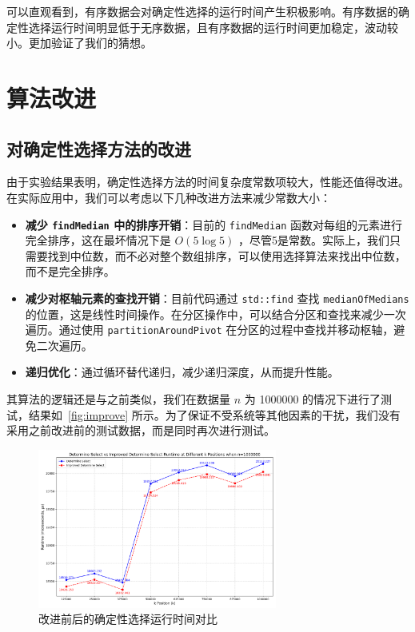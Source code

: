 可以直观看到，有序数据会对确定性选择的运行时间产生积极影响。有序数据的确定性选择运行时间明显低于无序数据，且有序数据的运行时间更加稳定，波动较小。更加验证了我们的猜想。
\section{算法改进}

\subsection{对确定性选择方法的改进}

由于实验结果表明，确定性选择方法的时间复杂度常数项较大，性能还值得改进。在实际应用中，我们可以考虑以下几种改进方法来减少常数大小：\begin{itemize}
    \item \textbf{减少 \texttt{findMedian} 中的排序开销}：目前的 \texttt{findMedian} 函数对每组的元素进行完全排序，这在最坏情况下是 $O(5 \log 5)$ ，尽管5是常数。实际上，我们只需要找到中位数，而不必对整个数组排序，可以使用选择算法来找出中位数，而不是完全排序。
    \item \textbf{减少对枢轴元素的查找开销}：目前代码通过 \texttt{std::find} 查找 \texttt{medianOfMedians} 的位置，这是线性时间操作。在分区操作中，可以结合分区和查找来减少一次遍历。通过使用 \texttt{partitionAroundPivot} 在分区的过程中查找并移动枢轴，避免二次遍历。
    \item \textbf{递归优化}：通过循环替代递归，减少递归深度，从而提升性能。
\end{itemize}

其算法的逻辑还是与之前类似，我们在数据量 $n$ 为 1000000 的情况下进行了测试，结果如~\autoref{fig:improve} 所示。为了保证不受系统等其他因素的干扰，我们没有采用之前改进前的测试数据，而是同时再次进行测试。
\begin{figure}[htbp]
    \centering
    \includegraphics[width=0.7\textwidth]{../figure/determine_compare_1000000.png}
    \caption{改进前后的确定性选择运行时间对比}
    \label{fig:improve}
\end{figure}

